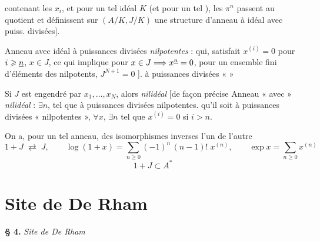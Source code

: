 \documentclass[11pt,a4paper]{article}
\begin{document}
contenant les $x_{i}$, et pour un tel idéal $K$
(et pour un tel ), les $\pi^{n}$ passent au
quotient et définissent sur $(A/K, J/K)$ une structure d'anneau à idéal avec
puiss. divisées].

Anneau avec idéal à puissances divisées \emph{nilpotentes} : qui, satisfait
 $x^{(i)} = 0$ pour $i \geqslant \uncertain{n}$, $x \in J$,
ce qui implique pour $x \in J \Longrightarrow x^{\uncertain{n}} = 0$,
pour un ensemble fini d'éléments
 des nilpotents, \ill{} $J^{N+1} = 0$ ].
 \ill{} à puissances divisées «  »

Si $J$ est engendré par $x_{1}, \ldots, x_{N}$, alors \ill{}
\emph{nilidéal} [de façon précise \ill{}
Anneau « avec » \emph{nilidéal} : 
$\exists n$, tel que \struck{\ill{}} \ill{} à puissances
divisées nilpotentes. \struck{\ill{}} qu'il soit
\struck{\ill{}} à puissances divisées « nilpotentes »,
$\forall x$, $\exists n$ tel que $x^{(i)} = 0$ si $i > n$.

On a, pour un tel anneau, des
isomorphismes inverses l'un de l'autre
\[
  1 + J \;\rightleftarrows\; J, \qquad
  \log(1+x) = \sum_{n \geqslant 0} (-1)^{n}\,(n-1)!\; x^{(n)}, \qquad
  \exp x = \sum_{n \geqslant 0} x^{(n)}
\]
\[
  1 + J \subset A^{*}
\]
\section{Site de De Rham}

\textbf{§ 4.} \emph{Site de De Rham}

\end{document}
